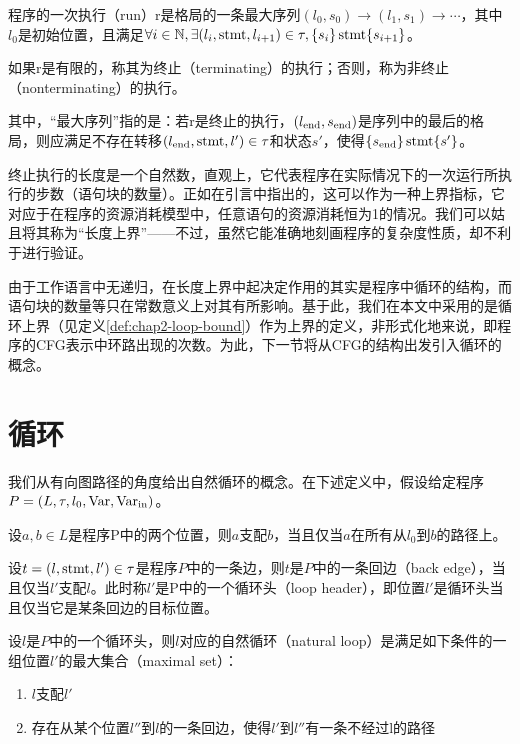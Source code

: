 \begin{definition}
  程序的一次执行（run）r是格局的一条最大序列$(l_0, s_0)
  \rightarrow (l_1, s_1) \rightarrow
  \cdots$，其中$l_0$是初始位置，且满足$\forall i \in \mathbb{N},
  \exists (l_i, \operatorname{stmt}, l_{i + 1}) \in \tau, \{ s_i \} \operatorname{stmt} \{
  s_{i + 1} \}$。
  
  如果r是有限的，称其为终止（terminating）的执行；否则，称为非终止（nonterminating）的执行。
  
  其中，“最大序列”指的是：若r是终止的执行，$(l_{\operatorname{end}},
  s_{\operatorname{end}})$是序列中的最后的格局，则应满足不存在转移$(l_{\operatorname{end}},
  \operatorname{stmt}, l') \in \tau$和状态$s'$，使得$\{ s_{\operatorname{end}} \}
  \operatorname{stmt} \{ s' \}$。
\end{definition}

终止执行的长度是一个自然数，直观上，它代表程序在实际情况下的一次运行所执行的步数（语句块的数量）。正如在引言中指出的，这可以作为一种上界指标，它对应于在程序的资源消耗模型中，任意语句的资源消耗恒为1的情况。我们可以姑且将其称为“长度上界”——不过，虽然它能准确地刻画程序的复杂度性质，却不利于进行验证。

由于工作语言中无递归，在长度上界中起决定作用的其实是程序中循环的结构，而语句块的数量等只在常数意义上对其有所影响。基于此，我们在本文中采用的是循环上界（见定义\ref{def:chap2-loop-bound}）作为上界的定义，非形式化地来说，即程序的CFG表示中环路出现的次数。为此，下一节将从CFG的结构出发引入循环的概念。

\section{循环}

我们从有向图路径的角度给出自然循环的概念。在下述定义中，假设给定程序$P
= (L, \tau, l_0, \operatorname{Var}, \operatorname{Var}_{\operatorname{in}})$。

\begin{definition}
  设$a, b \in
  L$是程序P中的两个位置，则$a$支配$b$，当且仅当$a$在所有从$l_0$到$b$的路径上。
\end{definition}

\begin{definition}
  设$t = (l, \operatorname{stmt}, l') \in \tau$是程序$P$中的一条边，则$t$是$P$中的一条回边（back edge），当且仅当$l'$支配$l$。此时称$l'$是P中的一个循环头（loop header），即位置$l'$是循环头当且仅当它是某条回边的目标位置。
\end{definition}

\begin{definition}
  设$l$是$P$中的一个循环头，则$l$对应的自然循环（natural loop）是满足如下条件的一组位置$l'$的最大集合（maximal set）：
  
  \begin{enumerate}
    \item $l$支配$l'$
    
    \item 存在从某个位置$l''$到$l$的一条回边，使得$l'$到$l''$有一条不经过l的路径
  \end{enumerate}
\end{definition}

